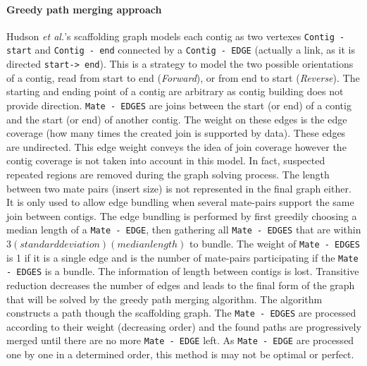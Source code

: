 \documentclass[12pt]{article}
\begin{document}
\paragraph*{Greedy path merging approach}
Hudson \textit{et al.}'s scaffolding graph models each contig as two vertexes \texttt{\footnotesize Contig - start} and \texttt{\footnotesize Contig - end} connected by a \texttt{\footnotesize Contig - EDGE} (actually a link, as it is directed \texttt{\footnotesize start-> end}). This is a strategy to model the two possible orientations of a contig, read from start to end (\textit{Forward}), or from end to start (\textit{Reverse}). The starting and ending point of a contig are arbitrary as contig building does not provide direction. \texttt{\footnotesize Mate - EDGES} are joins between the start (or end) of a contig and the start (or end) of another contig. The weight on these edges is the edge coverage (how many times the created join is supported by data). These edges are undirected. This edge weight conveys the idea of join coverage however the contig coverage is not taken into account in this model. In fact, suspected repeated regions are removed during the graph solving process. The length between two mate pairs (insert size) is not represented in the final graph either. It is only used to allow edge bundling when several mate-pairs support the same join between contigs. The edge bundling is performed by first greedily choosing a median length of a \texttt{\footnotesize Mate - EDGE}, then gathering all \texttt{\footnotesize Mate - EDGES} that are within $3(standard deviation)(median length)$ to bundle. The weight of \texttt{\footnotesize Mate - EDGES} is 1 if it is a single edge and is the number of mate-pairs participating if the \texttt{\footnotesize Mate - EDGES} is a bundle. The information of length between contigs is lost. Transitive reduction decreases the number of edges and leads to the final form of the graph that will be solved by the greedy path merging algorithm. 
The algorithm constructs a path though the scaffolding graph. The \texttt{\footnotesize Mate - EDGES} are processed according to their weight (decreasing order) and the found paths are progressively merged until there are no more \texttt{\footnotesize Mate - EDGE} left. As \texttt{\footnotesize Mate - EDGE} are processed one by one in a determined order, this method is may not be optimal or perfect. 
\clearpage
\end{document}

